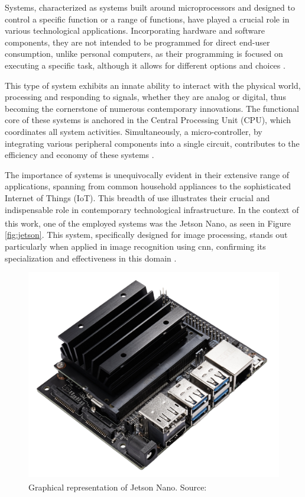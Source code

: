  Systems, characterized as systems built around microprocessors and designed to control a specific function or a range of functions, have played a crucial role in various technological applications. Incorporating hardware and software components, they are not intended to be programmed for direct end-user consumption, unlike personal computers, as their programming is focused on executing a specific task, although it allows for different options and choices \cite{heath2002embedded}.

This type of system exhibits an innate ability to interact with the physical world, processing and responding to signals, whether they are analog or digital, thus becoming the cornerstone of numerous contemporary innovations. The functional core of these systems is anchored in the Central Processing Unit (CPU), which coordinates all system activities. Simultaneously, a micro-controller, by integrating various peripheral components into a single circuit, contributes to the efficiency and economy of these systems \cite{peckol2019embedded}.

The importance of  systems is unequivocally evident in their extensive range of applications, spanning from common household appliances to the sophisticated Internet of Things (IoT). This breadth of use illustrates their crucial and indispensable role in contemporary technological infrastructure. In the context of this work, one of the employed  systems was the Jetson Nano\textsuperscript{\textregistered}, as seen in Figure \ref{fig:jetson}. This system, specifically designed for image processing, stands out particularly when applied in image recognition using \acrfull{cnn}, confirming its specialization and effectiveness in this domain \cite{nvidia_jetson_2019}.

\begin{figure}[ht!]
\centering
\includegraphics[width=.65\linewidth]{images/Development/chap3/JetsonNano.png}
\caption{Graphical representation of Jetson Nano\textsuperscript{\textregistered}. Source: \cite{nvidia_jetson_2019}}
\label{fig: jetson}
\end{figure}

